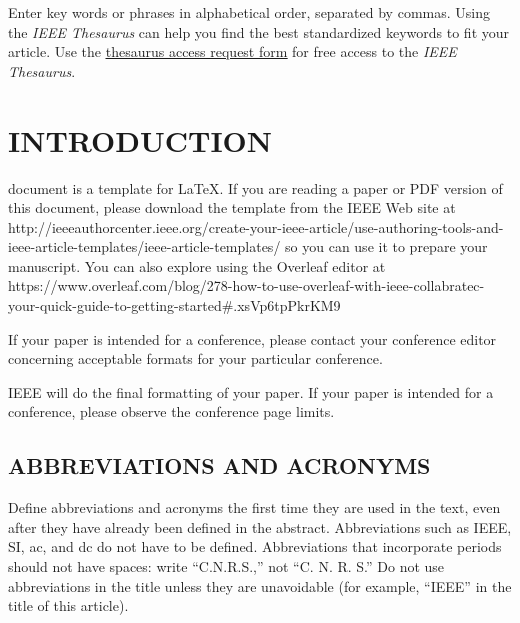 \documentclass{ieeetj}
\begin{document}
\begin{IEEEkeywords}
Enter key words or phrases in alphabetical order, separated by
commas. Using the \textit{IEEE Thesaurus} can help you find the best
standardized keywords to fit your article. Use the \underline{\href{https://www.ieee.org/publications/services/thesaurus.html}{thesaurus
access request form}} for free access to the \textit{IEEE Thesaurus}.
\end{IEEEkeywords}


\maketitle

\section{INTRODUCTION}
 document is a template for \LaTeX. If you are
reading a paper or PDF version of this document, please download the
template from the IEEE Web site at 
http://\discretionary{}{}{}ieeeauthorcenter.ieee.org/\discretionary{}{}{}create-your-ieee-article/\discretionary{}{}{}use-authoring-tools-and-ieee-article-templates/\discretionary{}{}{}ieee-article-templates/
so you can use it to prepare your manuscript.
You can also explore using the Overleaf editor at
https://\discretionary{}{}{}www.overleaf.com/\discretionary{}{}{}blog/\discretionary{}{}{}278-how-to-use-overleaf-with-ieee-collabratec-your-quick-guide-to-getting-started\discretionary{}{}{}\#.xsVp6tpPkrKM9

If your paper is intended for a conference, please contact your conference
editor concerning acceptable formats for your particular
conference.

IEEE will do the final formatting of your paper. If your paper is intended
for a conference, please observe the conference page limits.

\subsection{ABBREVIATIONS AND ACRONYMS}
Define abbreviations and acronyms the first time they are used in the text,
even after they have already been defined in the abstract. Abbreviations
such as IEEE, SI, ac, and dc do not have to be defined. Abbreviations that
incorporate periods should not have spaces: write ``C.N.R.S.,'' not ``C. N.
R. S.'' Do not use abbreviations in the title unless they are unavoidable
(for example, ``IEEE'' in the title of this article).
\end{document}
